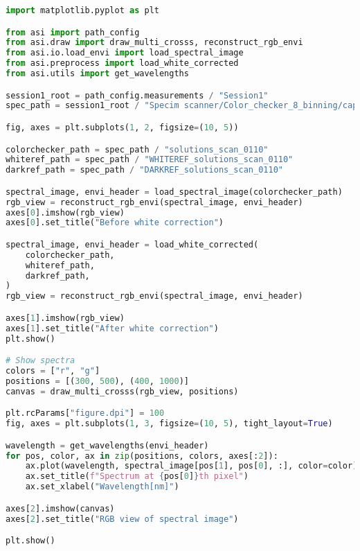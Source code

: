 \begin{lstlisting}[language=python, caption=White correction for Specium Scanner, label={code:wc-specim-scanner}]
import matplotlib.pyplot as plt

from asi import path_config
from asi.draw import draw_multi_crosss, reconstruct_rgb_envi
from asi.io.load_envi import load_spectral_image
from asi.preprocess import load_white_corrected
from asi.utils import get_wavelengths

session1_root = path_config.measurements / "Session1"
spec_path = session1_root / "Specim scanner/Color_checker_8_binning/capture"

fig, axes = plt.subplots(1, 2, figsize=(10, 5))

colorchecker_path = spec_path / "solutions_scan_0110"
whiteref_path = spec_path / "WHITEREF_solutions_scan_0110"
darkref_path = spec_path / "DARKREF_solutions_scan_0110"

spectral_image, envi_header = load_spectral_image(colorchecker_path)
rgb_view = reconstruct_rgb_envi(spectral_image, envi_header)
axes[0].imshow(rgb_view)
axes[0].set_title("Before white correction")

spectral_image, envi_header = load_white_corrected(
    colorchecker_path,
    whiteref_path,
    darkref_path,
)
rgb_view = reconstruct_rgb_envi(spectral_image, envi_header)

axes[1].imshow(rgb_view)
axes[1].set_title("After white correction")
plt.show()

# Show spectra
colors = ["r", "g"]
positions = [(300, 500), (400, 1000)]
canvas = draw_multi_crosss(rgb_view, positions)

plt.rcParams["figure.dpi"] = 100
fig, axes = plt.subplots(1, 3, figsize=(10, 5), tight_layout=True)

wavelength = get_wavelengths(envi_header)
for pos, color, ax in zip(positions, colors, axes[:2]):
    ax.plot(wavelength, spectral_image[pos[1], pos[0], :], color=color)
    ax.set_title(f"Spectrum at {pos[0]}th pixel")
    ax.set_xlabel("Wavelength[nm]")

axes[2].imshow(canvas)
axes[2].set_title("RGB view of spectral image")

plt.show()
\end{lstlisting}